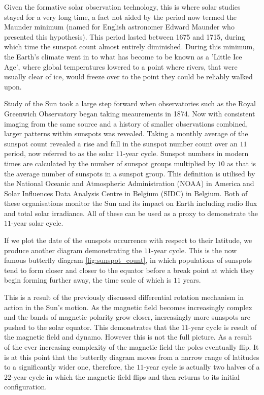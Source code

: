 Given the formative solar observation technology, this is where solar studies stayed for a very long time, a fact not aided by the period now termed the Maunder minimum (named for English astronomer Edward Maunder who presented this hypothesis).
This period lasted between 1675 and 1715, during which time the sunspot count almost entirely diminished.
During this minimum, the Earth's climate went in to what has become to be known as a 'Little Ice Age', where global temperatures lowered to a point where rivers, that were usually clear of ice, would freeze over to the point they could be reliably walked upon. %

Study of the Sun took a large step forward when observatories such as the Royal Greenwich Observatory began taking meaurements in 1874.
Now with consistent imaging from the same source and a history of smaller observations combined, larger patterns within sunspots was revealed.
Taking a monthly average of the sunspot count revealed a rise and fall in the sunspot number count over an $11$ period, now referred to as the solar $11$-year cycle.
Sunspot numbers in modern times are calculated by the number of sunspot groups multiplied by $10$ as that is the average number of sunspots in a sunspot group.
This definition is utilised by the National Oceanic and Atmospheric Administration (NOAA) in America and Solar Influences Data Analysis Centre in Belgium (SIDC) in Belgium.
Both of these organisations monitor the Sun and its impact on Earth including radio flux and total solar irradiance.
All of these can be used as a proxy to demonstrate the $11$-year solar cycle.

If we plot the date of the sunspots occurrence with respect to their latitude, we produce another diagram demonstrating the $11$-year cycle.
This is the now famous butterfly diagram \ref{fig:sunspot_count}, in which populations of sunspots tend to form closer and closer to the equator before a break point at which they begin forming further away, the time scale of which is $11$ years.

This is a result of the previously discussed differential rotation mechanism in action in the Sun's motion.
As the magnetic field becomes increasingly complex and the bands of magnetic polarity grow closer, increasingly more sunspots are pushed to the solar equator.
This demonstrates that the $11$-year cycle is result of the magnetic field and dynamo.
However this is not the full picture.
As a result of the ever increasing complexity of the magnetic field the poles eventually flip.
It is at this point that the butterfly diagram moves from a narrow range of latitudes to a significantly wider one, therefore, the $11$-year cycle is actually two halves of a $22$-year cycle in which the magnetic field flips and then returns to its initial configuration.

